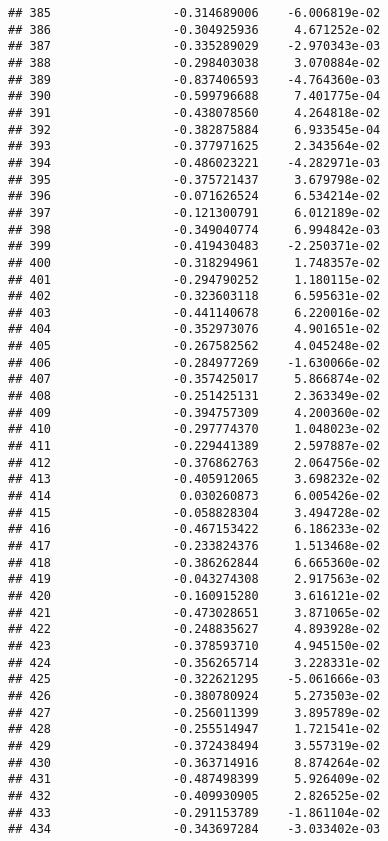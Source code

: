 \documentclass[
]{article}
\begin{document}
\begin{verbatim}
## 385                 -0.314689006    -6.006819e-02
## 386                 -0.304925936     4.671252e-02
## 387                 -0.335289029    -2.970343e-03
## 388                 -0.298403038     3.070884e-02
## 389                 -0.837406593    -4.764360e-03
## 390                 -0.599796688     7.401775e-04
## 391                 -0.438078560     4.264818e-02
## 392                 -0.382875884     6.933545e-04
## 393                 -0.377971625     2.343564e-02
## 394                 -0.486023221    -4.282971e-03
## 395                 -0.375721437     3.679798e-02
## 396                 -0.071626524     6.534214e-02
## 397                 -0.121300791     6.012189e-02
## 398                 -0.349040774     6.994842e-03
## 399                 -0.419430483    -2.250371e-02
## 400                 -0.318294961     1.748357e-02
## 401                 -0.294790252     1.180115e-02
## 402                 -0.323603118     6.595631e-02
## 403                 -0.441140678     6.220016e-02
## 404                 -0.352973076     4.901651e-02
## 405                 -0.267582562     4.045248e-02
## 406                 -0.284977269    -1.630066e-02
## 407                 -0.357425017     5.866874e-02
## 408                 -0.251425131     2.363349e-02
## 409                 -0.394757309     4.200360e-02
## 410                 -0.297774370     1.048023e-02
## 411                 -0.229441389     2.597887e-02
## 412                 -0.376862763     2.064756e-02
## 413                 -0.405912065     3.698232e-02
## 414                  0.030260873     6.005426e-02
## 415                 -0.058828304     3.494728e-02
## 416                 -0.467153422     6.186233e-02
## 417                 -0.233824376     1.513468e-02
## 418                 -0.386262844     6.665360e-02
## 419                 -0.043274308     2.917563e-02
## 420                 -0.160915280     3.616121e-02
## 421                 -0.473028651     3.871065e-02
## 422                 -0.248835627     4.893928e-02
## 423                 -0.378593710     4.945150e-02
## 424                 -0.356265714     3.228331e-02
## 425                 -0.322621295    -5.061666e-03
## 426                 -0.380780924     5.273503e-02
## 427                 -0.256011399     3.895789e-02
## 428                 -0.255514947     1.721541e-02
## 429                 -0.372438494     3.557319e-02
## 430                 -0.363714916     8.874264e-02
## 431                 -0.487498399     5.926409e-02
## 432                 -0.409930905     2.826525e-02
## 433                 -0.291153789    -1.861104e-02
## 434                 -0.343697284    -3.033402e-03

\end{verbatim}
\end{document}
